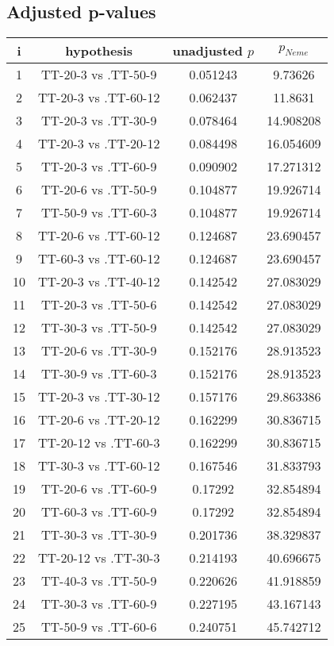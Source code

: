 \documentclass[a4paper,10pt]{article}
\begin{document}
\begin{landscape}
\pagebreak

\subsection{Adjusted p-values}

\begin{table}[!htp]
\centering\scriptsize
\begin{tabular}{cccc}
i&hypothesis&unadjusted $p$&$p_{Neme}$\\
\hline1&TT-20-3 vs .TT-50-9&0.051243&9.73626\\
2&TT-20-3 vs .TT-60-12&0.062437&11.8631\\
3&TT-20-3 vs .TT-30-9&0.078464&14.908208\\
4&TT-20-3 vs .TT-20-12&0.084498&16.054609\\
5&TT-20-3 vs .TT-60-9&0.090902&17.271312\\
6&TT-20-6 vs .TT-50-9&0.104877&19.926714\\
7&TT-50-9 vs .TT-60-3&0.104877&19.926714\\
8&TT-20-6 vs .TT-60-12&0.124687&23.690457\\
9&TT-60-3 vs .TT-60-12&0.124687&23.690457\\
10&TT-20-3 vs .TT-40-12&0.142542&27.083029\\
11&TT-20-3 vs .TT-50-6&0.142542&27.083029\\
12&TT-30-3 vs .TT-50-9&0.142542&27.083029\\
13&TT-20-6 vs .TT-30-9&0.152176&28.913523\\
14&TT-30-9 vs .TT-60-3&0.152176&28.913523\\
15&TT-20-3 vs .TT-30-12&0.157176&29.863386\\
16&TT-20-6 vs .TT-20-12&0.162299&30.836715\\
17&TT-20-12 vs .TT-60-3&0.162299&30.836715\\
18&TT-30-3 vs .TT-60-12&0.167546&31.833793\\
19&TT-20-6 vs .TT-60-9&0.17292&32.854894\\
20&TT-60-3 vs .TT-60-9&0.17292&32.854894\\
21&TT-30-3 vs .TT-30-9&0.201736&38.329837\\
22&TT-20-12 vs .TT-30-3&0.214193&40.696675\\
23&TT-40-3 vs .TT-50-9&0.220626&41.918859\\
24&TT-30-3 vs .TT-60-9&0.227195&43.167143\\
25&TT-50-9 vs .TT-60-6&0.240751&45.742712\\

\end{tabular}
\end{table}
\end{landscape}
\end{document}
